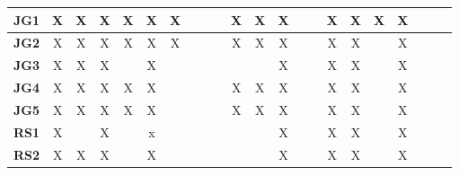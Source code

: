 \documentclass[12pt]{article}
\begin{document}
\begin{table}[H]
\begin{adjustwidth}{-0.8in}{-1.2in}
{\begin{tabular}{c|c|c|c|c|c|c|c|c|c|c|c|c|c|c|c|c|c|c|c|c|c}
\multicolumn{1}{|l|}{\textbf{JG1}}   &      X       &      X       &       X      &      X       &       X      &       X      &              &              &              &      X       &      X       &      X       &              &              &      X      &      X       &      X      &        X    &             &             \\ \hline
\multicolumn{1}{|l|}{\textbf{JG2}}   &      X       &      X       &       X      &      X       &       X      &       X      &              &              &              &      X       &      X       &      X       &              &              &      X      &      X       &             &       X     &             &             \\ \hline
\multicolumn{1}{|l|}{\textbf{JG3}}   &      X       &      X       &       X      &              &       X      &              &              &              &              &              &              &      X       &              &              &      X      &      X       &             &       X     &             &             \\ \hline
\multicolumn{1}{|l|}{\textbf{JG4}}   &      X       &      X       &       X      &      X       &       X      &              &              &              &              &      X       &      X       &      X       &              &              &      X      &      X       &             &       X     &             &             \\ \hline
\multicolumn{1}{|l|}{\textbf{JG5}}   &      X       &      X       &       X      &      X       &       X      &              &              &              &              &      X       &      X       &      X       &              &              &      X      &      X       &             &       X     &             &             \\ \hline
\multicolumn{1}{|l|}{\textbf{RS1}}   &      X       &              &       X      &              &       x      &              &              &              &              &              &              &      X       &              &              &      X      &      X       &             &       X     &             &             \\ \hline
\multicolumn{1}{|l|}{\textbf{RS2}}   &      X       &      X       &       X      &              &       X      &              &              &              &              &              &              &      X       &              &              &      X      &      X       &             &       X     &             &             \\ \hline

\end{tabular}}
\end{adjustwidth}
\end{table}
\end{document}
